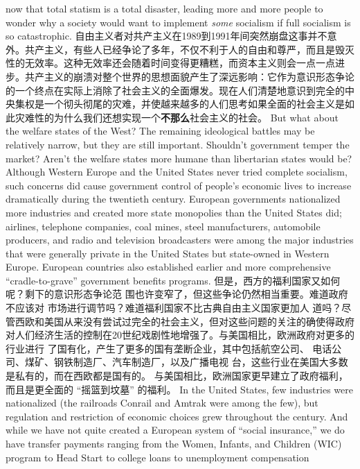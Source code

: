 \begin{paracol}{2}
now that total statism is a total disaster, leading more and more
people to wonder why a society would want to implement \textit{some}
socialism if full socialism is so catastrophic.
\switchcolumn
自由主义者对共产主义在1989到1991年间突然崩盘这事并不意外。共产主义，有些人已经争论了多年，不仅不利于人的自由和尊严，而且是毁灭性的无效率。这种无效率还会随着时间变得更糟糕，而资本主义则会一点一点进步。共产主义的崩溃对整个世界的思想面貌产生了深远影响：它作为意识形态争论的一个终点在实际上消除了社会主义的全面爆发。现在人们清楚地意识到完全的中央集权是一个彻头彻尾的灾难，并使越来越多的人们思考如果全面的社会主义是如此灾难性的为什么我们还想实现一个\textbf{不那么}社会主义的社会。
\switchcolumn*
But what about the welfare states of the West? The remaining ideological battles may be relatively narrow, but they are
still important. Shouldn't government temper the market?
Aren't the welfare states more humane than libertarian states
would be? Although Western Europe and the United States
never tried complete socialism, such concerns did cause government control of people's economic lives to increase dramatically
during the twentieth century. European governments nationalized more industries and created more state monopolies than
the United States did; airlines, telephone companies, coal
mines, steel manufacturers, automobile producers, and radio
and television broadcasters were among the major industries
that were generally private in the United States but state-owned in Western Europe. European countries also established
earlier and more comprehensive ``cradle-to-grave'' government
benefits programs.
\switchcolumn
但是，西方的福利国家又如何呢？剩下的意识形态争论范
围也许变窄了，但这些争论仍然相当重要。难道政府不应该对
市场进行调节吗？难道福利国家不比古典自由主义国家更加人
道吗？尽管西欧和美国从来没有尝试过完全的社会主义，但对这些问题的关注的确使得政府对人们经济生活的控制在20世纪戏剧性地增强了。与美国相比，欧洲政府对更多的行业进行
了国有化，产生了更多的国有垄断企业，其中包括航空公司、
电话公司、煤矿、钢铁制造厂、汽车制造厂，以及广播电视
台，这些行业在美国大多数是私有的，而在西欧都是国有的。
与美国相比，欧洲国家更早建立了政府福利，而且是更全面的
“摇篮到坟墓” 的福利。
\switchcolumn*
In the United States, few industries were nationalized (the
railroads Conrail and Amtrak were among the few), but regulation and restriction of economic choices grew throughout the
century. And while we have not quite created a European system of ``social insurance,'' we do have transfer payments ranging from the Women, Infants, and Children (WIC) program to
Head Start to college loans to unemployment compensation

\end{paracol}
